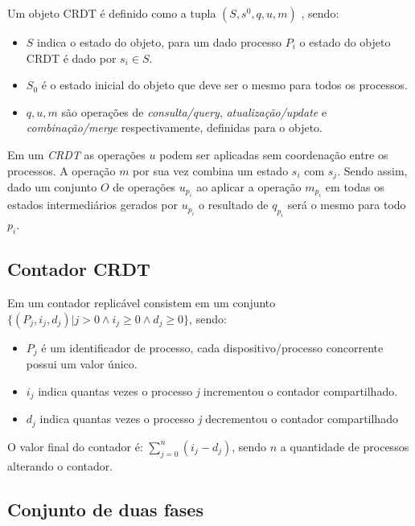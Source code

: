 \documentclass[12pt]{article}
\begin{document}
Um objeto CRDT é definido como a tupla \ensuremath{(S, s^0, q, u, m)} \cite{shapiro:11}, sendo:

\begin{itemize}
\item \ensuremath{S} indica o estado do objeto, para um dado processo \ensuremath{P_i} o estado do objeto CRDT é dado por \ensuremath{s_i \in S}.
\item \ensuremath{S_0} é o estado inicial do objeto que deve ser o mesmo para todos os processos.
\item \ensuremath{q, u, m} são operações de {\it consulta/query}, {\it atualização/update} e {\it combinação/merge} respectivamente, definidas para o objeto.
\end{itemize}

Em um {\it CRDT} as operações \ensuremath{u} podem ser aplicadas sem coordenação entre os processos. A operação \ensuremath{m} por sua vez combina um estado \ensuremath{s_i} com \ensuremath{s_j}. Sendo assim, dado um conjunto \ensuremath{O} de operações \ensuremath{u_{p_i}} ao aplicar a operação \ensuremath{m_{p_i}} em todas os estados intermediários gerados por \ensuremath{u_{p_i}} o resultado de \ensuremath{q_{p_i}} será o mesmo para todo \ensuremath{p_i}.

\subsection{Contador CRDT}

Em um contador replicável consistem em um conjunto \ensuremath{\{(P_j, i_j, d_j) | j > 0 \land	i_j \geq 0 \land d_j \geq 0\}}, sendo:

\begin{itemize}
    \item \ensuremath{P_j} é um identificador de processo, cada dispositivo/processo concorrente possui um valor único.
    \item \ensuremath{i_j} indica quantas vezes o processo {\it j} incrementou o contador compartilhado.
    \item \ensuremath{d_j} indica quantas vezes o processo {\it j} decrementou o contador compartilhado
\end{itemize}

O valor final do contador é: \ensuremath{\sum_{j=0}^{n}(i_j - d_j)}, sendo \ensuremath{n} a quantidade de processos alterando o contador.

\subsection{Conjunto de duas fases}
\end{document}
